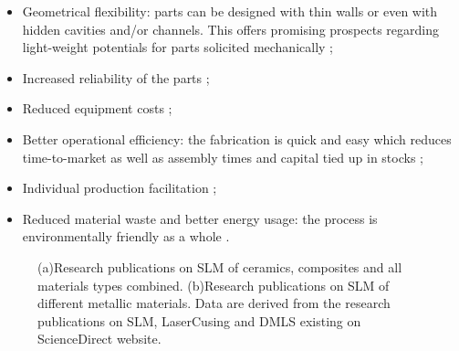 \begin{itemize}
\item Geometrical flexibility: parts can be designed with thin walls or even with hidden cavities and/or channels. This offers promising prospects regarding light-weight potentials for parts solicited mechanically \parencite{Lippert};
\item Increased reliability of the parts \parencite{Haase};
\item Reduced equipment costs \parencite{Hoeges};
\item Better operational efficiency: the fabrication is quick and easy which reduces time-to-market as well as assembly times and capital tied up in stocks \parencite{Hoeges};
\item Individual production facilitation \parencite{Haase};
\item Reduced material waste and better energy usage: the process is  environmentally friendly as a whole \parencite{Haase}.
\end{itemize}

\begin{figure}[ht]
\centering
\noindent{}
\decoRule

\caption[(a)Research publications on SLM of ceramics, composites and all materials types combined. (b)Research publications on SLM of different metallic materials]{(a)Research publications on SLM of ceramics, composites and all materials types combined. (b)Research publications on SLM of different metallic materials. Data are derived from the research publications on SLM, LaserCusing and DMLS existing on ScienceDirect website.}
\label{fig:Evol}
\end{figure}

